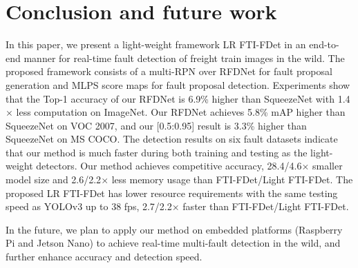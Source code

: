 \section{Conclusion and future work}
\label{conclusion}
In this paper, we present a light-weight framework LR FTI-FDet in an end-to-end manner for real-time fault detection of freight train images in the wild. The proposed framework consists of a multi-RPN over RFDNet for fault proposal generation and MLPS score maps for fault proposal detection. Experiments show that the Top-1 accuracy of our RFDNet is 6.9\% higher than SqueezeNet with 1.4$\times$ less computation on ImageNet. Our RFDNet achieves 5.8\% mAP higher than SqueezeNet on VOC 2007, and our [0.5:0.95] result is 3.3\% higher than SqueezeNet on MS COCO. The detection results on six fault datasets indicate that our method is much faster during both training and testing as the light-weight detectors. Our method achieves competitive accuracy, 28.4/4.6$\times$ smaller model size and 2.6/2.2$\times$ less memory usage than FTI-FDet/Light FTI-FDet. The proposed LR FTI-FDet has lower resource requirements with the same testing speed as YOLOv3 up to 38 fps, 2.7/2.2$\times$ faster than FTI-FDet/Light FTI-FDet.

In the future, we plan to apply our method on embedded platforms (Raspberry Pi and Jetson Nano) to achieve real-time multi-fault detection in the wild, and further enhance accuracy and detection speed. 
